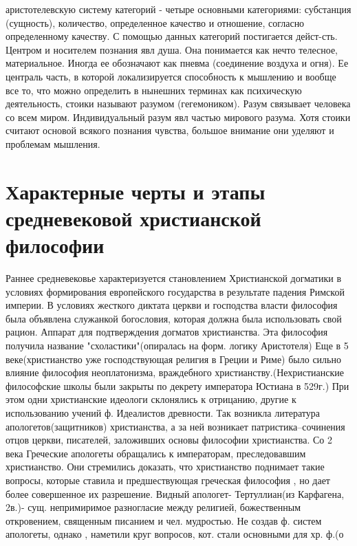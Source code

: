 \documentclass[12pt]{article}
\begin{document}
аристотелевскую  систему  категорий  -  четыре  основными  категориями:  субстанция  (сущность),  количество,
определенное  качество  и  отношение,  согласно  определенному  качеству.  С  помощью  данных  категорий
постигается  дейст-сть.  Центром  и  носителем  познания  явл  душа.  Она  понимается  как  нечто  телесное,
материальное. Иногда ее обозначают как пневма (соединение воздуха и огня). Ее централь часть, в которой
локализируется способность к мышлению и вообще все то, что можно определить в нынешних терминах как
психическую деятельность, стоики называют разумом (гегемоником). Разум связывает человека со всем миром.
Индивидуальный разум явл частью мирового разума. Хотя стоики считают основой всякого познания чувства,
большое внимание они уделяют и проблемам мышления. 

\newpage
\section{Характерные черты и этапы средневековой христианской философии}
Раннее  средневековье  характеризуется  становлением  Христианской  догматики  в  условиях  формирования
европейского  государства  в  результате  падения  Римской  империи.  В  условиях  жесткого  диктата  церкви  и
господства власти философия была объявлена служанкой богословия, которая должна была использовать свой
рацион.  Аппарат  для  подтверждения  догматов  христианства.  Эта  философия  получила  название
"схоластики"(опиралась на форм. логику Аристотеля)
Еще в 5 веке(христианство уже господствующая религия в Греции и Риме) было сильно влияние философия
неоплатонизма,  враждебного  христианству.(Нехристианские  философские  школы  были  закрыты  по  декрету
императора  Юстиана  в  529г.)  При  этом  одни  христианские  идеологи  склонялись  к  отрицанию,  другие  к 
использованию  учений  ф.  Идеалистов  древности.  Так  возникла  литература  апологетов(защитников)
христианства,  а  за  ней  возникает  патристика–сочинения  отцов  церкви,  писателей,  заложивших  основы
философии христианства.
Со 2 века Греческие апологеты обращались к императорам, преследовавшим христианство. Они стремились
доказать,  что  христианство  поднимает  такие  вопросы,  которые  ставила  и  предшествующая  греческая
философия , но дает более совершенное их разрешение. Видный апологет- Тертуллиан(из Карфагена, 2в.)- сущ.
непримиримое  разногласие  между  религией,  божественным  откровением,  священным  писанием  и  чел.
мудростью. Не создав ф. систем апологеты, однако , наметили круг вопросов, кот. стали основными для хр. ф.(о
\end{document}
